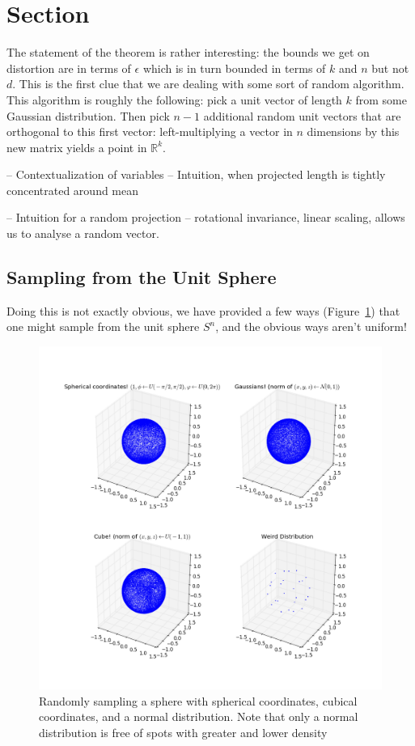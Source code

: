 \documentclass[11pt]{article}
\begin{document}
\section{Section}


The statement of the theorem is rather interesting: the bounds we get on
distortion are in terms of $\epsilon$ which is in turn bounded in terms of $k$
and $n$ but not $d$. This is the first clue that we are dealing with some sort
of random algorithm. This algorithm is roughly the following: pick a unit vector
of length $k$ from some Gaussian distribution. Then pick $n-1$ additional random
unit vectors that are orthogonal to this first vector: left-multiplying a vector
in $n$ dimensions by this new matrix yields a point in $\mathbb{R}^k$.

-- Contextualization of variables
-- Intuition, when projected length is tightly concentrated around mean

-- Intuition for a random projection
-- rotational invariance, linear scaling, allows us to analyse a random vector.

\subsection{Sampling from the Unit Sphere}

Doing this is not exactly obvious, we have provided a few ways
(Figure~\ref{fig:spheres}) that one might sample from the unit sphere $S^n$, and
the obvious ways aren't uniform!

\begin{figure}
  \begin{center}
    \includegraphics[width=0.9\linewidth]{spheres.png}
  \end{center}

  \caption{Randomly sampling a sphere with spherical coordinates, cubical
    coordinates, and a normal distribution. Note that only a normal distribution
    is free of spots with greater and lower density}
  \label{fig:spheres}
\end{figure}
\end{document}
